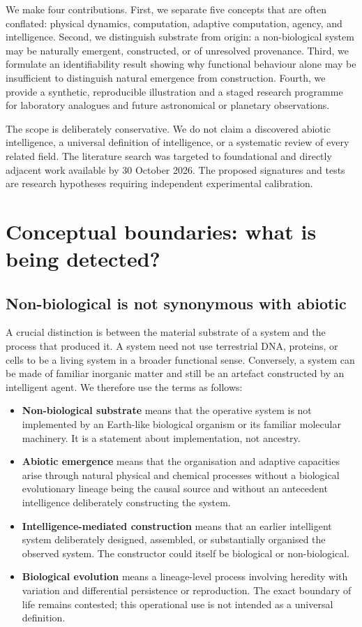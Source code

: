 \documentclass[11pt]{article}
\begin{document}
We make four contributions. First, we separate five concepts that are often conflated: physical dynamics, computation, adaptive computation, agency, and intelligence. Second, we distinguish substrate from origin: a non-biological system may be naturally emergent, constructed, or of unresolved provenance. Third, we formulate an identifiability result showing why functional behaviour alone may be insufficient to distinguish natural emergence from construction. Fourth, we provide a synthetic, reproducible illustration and a staged research programme for laboratory analogues and future astronomical or planetary observations.

The scope is deliberately conservative. We do not claim a discovered abiotic intelligence, a universal definition of intelligence, or a systematic review of every related field. The literature search was targeted to foundational and directly adjacent work available by 30 October 2026. The proposed signatures and tests are research hypotheses requiring independent experimental calibration.

\section{Conceptual boundaries: what is being detected?}

\subsection{Non-biological is not synonymous with abiotic}

A crucial distinction is between the material substrate of a system and the process that produced it. A system need not use terrestrial DNA, proteins, or cells to be a living system in a broader functional sense. Conversely, a system can be made of familiar inorganic matter and still be an artefact constructed by an intelligent agent. We therefore use the terms as follows:
\begin{itemize}
  \item \textbf{Non-biological substrate} means that the operative system is not implemented by an Earth-like biological organism or its familiar molecular machinery. It is a statement about implementation, not ancestry.
  \item \textbf{Abiotic emergence} means that the organisation and adaptive capacities arise through natural physical and chemical processes without a biological evolutionary lineage being the causal source and without an antecedent intelligence deliberately constructing the system.
  \item \textbf{Intelligence-mediated construction} means that an earlier intelligent system deliberately designed, assembled, or substantially organised the observed system. The constructor could itself be biological or non-biological.
  \item \textbf{Biological evolution} means a lineage-level process involving heredity with variation and differential persistence or reproduction. The exact boundary of life remains contested; this operational use is not intended as a universal definition.
\end{itemize}
\end{document}
